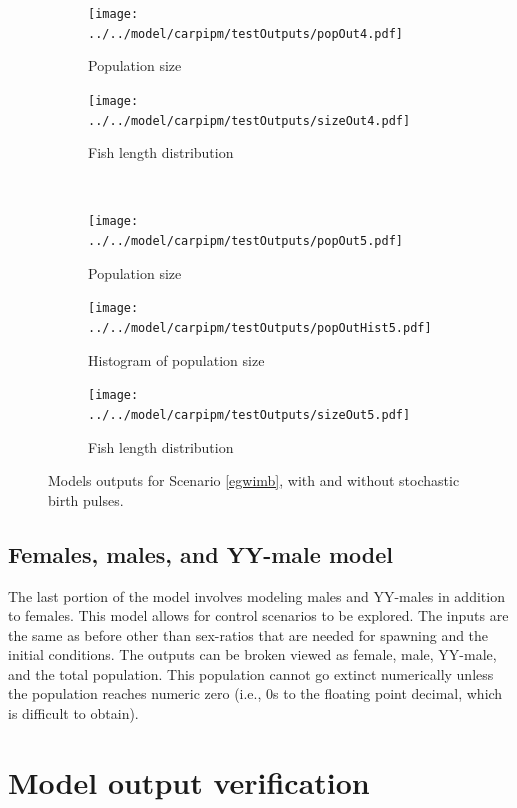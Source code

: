 \documentclass{article}[12pt]
\begin{document}
\begin{figure}[htbp]
	\centering
	\begin{subfigure}[b]{0.4\textwidth}
		\texttt{[image: ../../model/carpipm/testOutputs/popOut4.pdf]} 
		\caption{Population size} 
		\label{fig:pop4}
	\end{subfigure}
	\qquad
	\begin{subfigure}[b]{0.4\textwidth}
		\texttt{[image: ../../model/carpipm/testOutputs/sizeOut4.pdf]} 
		\caption{Fish length distribution} 
		\label{fig:size4}
	\end{subfigure}
	\qquad\\
	\begin{subfigure}[b]{0.4\textwidth}
		\texttt{[image: ../../model/carpipm/testOutputs/popOut5.pdf]} 
		\caption{Population size} 
		\label{fig:pop5}
	\end{subfigure}
	\qquad
	\begin{subfigure}[b]{0.4\textwidth}
		\texttt{[image: ../../model/carpipm/testOutputs/popOutHist5.pdf]} 
		\caption{Histogram of population size} 
		\label{fig:popHist5}
	\end{subfigure}
	\qquad
	\begin{subfigure}[b]{0.4\textwidth}
		\texttt{[image: ../../model/carpipm/testOutputs/sizeOut5.pdf]} 
		\caption{Fish length distribution} 
		\label{fig:size5}
	\end{subfigure}
   \caption{Models outputs for Scenario \ref{egwimb}, with and without stochastic birth pulses.}
   \label{fig:scn3out}
\end{figure}


\subsection{Females, males, and YY-male model}\label{fmYYm}

The last portion of the model involves modeling males and YY-males in addition to females.
This model allows for control scenarios to be explored. 
The inputs are the same as before other than sex-ratios that are needed for spawning and the initial conditions. 
The outputs can be broken viewed as female, male, YY-male, and the total population.
This population cannot go extinct numerically unless the population reaches numeric zero (i.e., 0s to the floating point decimal, which is difficult to obtain).  


\section{Model output verification}
\end{document}
